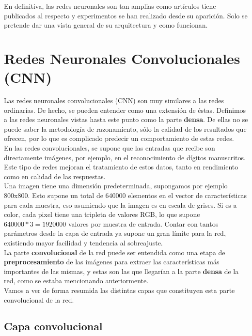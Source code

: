 \documentclass[11pt,fleqn]{book} %
\begin{document}
En definitiva, las redes neuronales son tan amplias como artículos tiene publicados al respecto y experimentos se han realizado desde su aparición. Solo se pretende dar una vista general de su arquitectura y como funcionan. 

\section{Redes Neuronales Convolucionales (CNN)}\label{sec:convolucional}

Las redes neuronales convolucionales (CNN) son muy similares a las redes ordinarias. De hecho, se pueden entender como una extensión de éstas. Definimos a las redes neuronales vistas hasta este punto como la parte \textbf{densa}. De ellas no se puede saber la metodología de razonamiento, sólo la calidad de los resultados que ofrecen, por lo que es complicado predecir un comportamiento de estas redes. \\

En las redes convolucionales, se supone que las entradas que recibe son directamente imágenes, por ejemplo, en el reconocimiento de dígitos manuscritos. Este tipo de redes mejoran el tratamiento de estos datos, tanto en rendimiento como en calidad de las respuestas. \\

Una imagen tiene una dimensión predeterminada, supongamos por ejemplo 800x800. Esto supone un total de 640000 elementos en el vector de características para cada muestra, eso asumiendo que la imagen es en escala de grises. Si es a color, cada pixel tiene una tripleta de valores RGB, lo que supone $640000*3=1920000$ valores por muestra de entrada. Contar con tantos parámetros desde la capa de entrada ya supone un gran límite para la red, existiendo mayor facilidad y tendencia al sobreajuste. \\

La parte \textbf{convolucional} de la red puede ser entendida como una etapa de \textbf{preprocesamiento} de las imágenes para extraer las características más importantes de las mismas, y estas son las que llegarían a la parte \textbf{densa} de la red, como se estaba mencionando anteriormente. \\

Vamos a ver de forma resumida las distintas capas que constituyen esta parte convolucional de la red.

\subsection{Capa convolucional}\label{sec:convolucional2}
\end{document}

